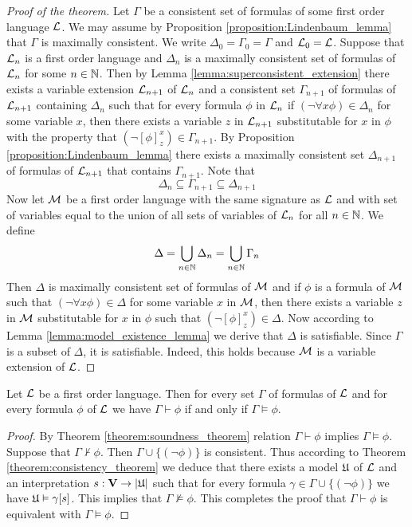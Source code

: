 \begin{proof}[Proof of the theorem]
Let $\Gamma$ be a consistent set of formulas of some first order language ${\mathcal L}$. We may assume by Proposition \ref{proposition:Lindenbaum_lemma} that $\Gamma$ is maximally consistent. We write $\Delta_0 = \Gamma_0 = \Gamma$ and ${\mathcal L}_0 = {\mathcal L}$. Suppose that ${\mathcal L}_n$ is a first order language and $\Delta_n$ is a maximally consistent set of formulas of ${\mathcal L}_n$ for some $n\in {\mathbb N}$. Then by Lemma \ref{lemma:superconsistent_extension} there exists a variable extension ${\mathcal L}_{n+1}$ of ${\mathcal L}_n$ and a consistent set $\Gamma_{n+1}$ of formulas of ${\mathcal L}_{n+1}$ containing $\Delta_n$ such that for every formula $\phi$ in ${\mathcal L}_n$ if $(\neg\forall x\phi) \in \Delta_n$ for some variable $x$, then there exists a variable $z$ in ${\mathcal L}_{n+1}$ substitutable for $x$ in $\phi$ with the property that $(\neg[\phi]^x_z) \in \Gamma_{n+1}$. By Proposition \ref{proposition:Lindenbaum_lemma} there exists a maximally consistent set $\Delta_{n+1}$ of formulas of ${\mathcal L}_{n+1}$ that contains $\Gamma_{n+1}$. Note that
$$\Delta_n \subseteq \Gamma_{n+1} \subseteq \Delta_{n+1}$$
Now let ${\mathcal M}$ be a first order language with the same signature as ${\mathcal L}$ and with set of variables equal to the union of all sets of variables of ${\mathcal L}_n$ for all $n\in {\mathbb N}$. We define
$$\Delta = \bigcup_{n\in {\mathbb N}} \Delta_n = \bigcup_{n\in {\mathbb N}} \Gamma_n$$
Then $\Delta$ is maximally consistent set of formulas of ${\mathcal M}$ and if $\phi$ is a formula of ${\mathcal M}$ such that $(\neg\forall x\phi) \in
\Delta$ for some variable $x$ in ${\mathcal M}$, then there exists a variable $z$ in ${\mathcal M}$ substitutable for $x$ in $\phi$ such that $(\neg[\phi]^x_z) \in \Delta$. Now according to Lemma \ref{lemma:model_existence_lemma} we derive that $\Delta$ is satisfiable. Since $\Gamma$ is a subset of $\Delta$, it is satisfiable. Indeed, this holds because ${\mathcal M}$ is a variable extension of ${\mathcal L}$.
\end{proof}

\begin{corollary}\label{corollary:Gödels_completeness_theorem}
Let ${\mathcal L}$ be a first order language. Then for every set $\Gamma$ of formulas of ${\mathcal L}$ and for every formula $\phi$ of ${\mathcal L}$ we have $\Gamma \vdash \phi$ if and only if $\Gamma \vDash \phi$.
\end{corollary}
\begin{proof}
By Theorem \ref{theorem:soundness_theorem} relation $\Gamma \vdash \phi$ implies $\Gamma \vDash \phi$. Suppose that $\Gamma \nvdash \phi$. Then $\Gamma\cup \{(\neg \phi)\}$ is consistent. Thus according to Theorem \ref{theorem:consistency_theorem} we deduce that there exists a model ${\mathfrak U}$ of ${\mathcal L}$ and an interpretation $s:\mathbf{V}\rightarrow |{\mathfrak U}|$ such that for every formula $\gamma \in \Gamma \cup \{(\neg \phi)\}$ we have ${\mathfrak U} \vDash \gamma[s]$. This implies that $\Gamma \nvDash \phi$. This completes the proof that $\Gamma \vdash \phi$ is equivalent with $\Gamma \vDash \phi$.
\end{proof}

